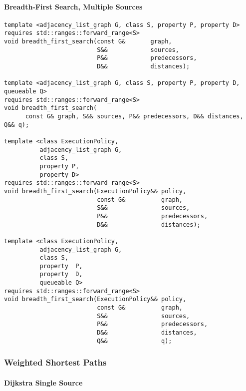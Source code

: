 \paragraph{Breadth-First Search, Multiple Sources}
\begin{lstlisting}
template <adjacency_list_graph G, class S, property P, property D>
requires std::ranges::forward_range<S>
void breadth_first_search(const G&       graph,
                          S&&            sources,
                          P&&            predecessors,
                          D&&            distances);

template <adjacency_list_graph G, class S, property P, property D, queueable Q>
requires std::ranges::forward_range<S>
void breadth_first_search(
      const G& graph, S&& sources, P&& predecessors, D&& distances, Q&& q);

template <class ExecutionPolicy,
          adjacency_list_graph G,
          class S,
          property P,
          property D>
requires std::ranges::forward_range<S>
void breadth_first_search(ExecutionPolicy&& policy,
                          const G&          graph,
                          S&&               sources,
                          P&&               predecessors,
                          D&&               distances);

template <class ExecutionPolicy,
          adjacency_list_graph G,
          class S,
          property  P,
          property  D,
          queueable Q>
requires std::ranges::forward_range<S>
void breadth_first_search(ExecutionPolicy&& policy,
                          const G&          graph,
                          S&&               sources,
                          P&&               predecessors,
                          D&&               distances,
                          Q&&               q);

\end{lstlisting}


\subsubsection{Weighted Shortest Paths}

\paragraph{Dijkstra Single Source}

